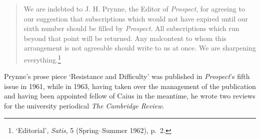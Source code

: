 \documentclass[]{article}
\begin{document}
\begin{quote}
\singlespacing We are indebted to J. H. Prynne, the Editor of
\emph{Prospect}, for agreeing to our suggestion that subscriptions which
would not have expired until our sixth number should be filled by
\emph{Prospect}. All subscriptions which run beyond that point will be
returned. Any malcontent to whom this arrangement is not agreeable
should write to us at once. We are sharpening everything.\footnote{‘Editorial’,
  \emph{Satis}, 5 (Spring–Summer 1962), p.~2.}
\end{quote}

\noindent Prynne’s prose piece ‘Resistance and Difficulty’ was published
in \emph{Prospect}’s fifth issue in 1961, while in 1963, having taken
over the management of the publication and having been appointed fellow
of Caius in the meantime, he wrote two reviews for the university
periodical \emph{The Cambridge Review}.
\end{document}
